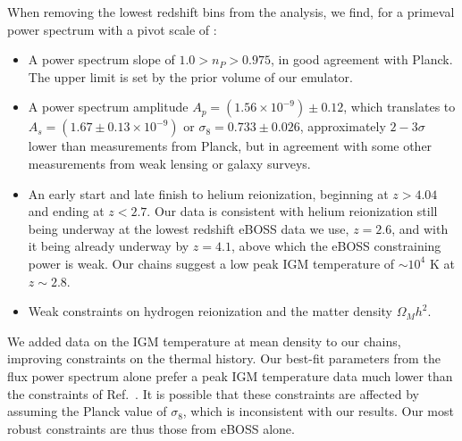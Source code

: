 When removing the lowest redshift bins from the analysis, we find, for a primeval power spectrum with a pivot scale of :
\begin{itemize}
    \item A power spectrum slope of $1.0 > n_P > 0.975$, in good agreement with Planck.
    The upper limit is set by the prior volume of our emulator.
    \item A power spectrum amplitude $A_p=\left(1.56\times10^{-9}\right) \pm 0.12$, which translates to $A_s=\left(1.67\pm0.13\times10^{-9}\right)$ or $\sigma_8 = 0.733 \pm 0.026$, approximately $2-3\sigma$ lower than measurements from Planck, but in agreement with some other measurements from weak lensing or galaxy surveys.
    \item An early start and late finish to helium reionization, beginning at $z > 4.04$ and ending at $z < 2.7$. Our data is consistent with helium reionization still being underway at the lowest redshift  eBOSS data we use, $z=2.6$, and with it being already underway by $z=4.1$, above which the eBOSS constraining power is weak. Our chains suggest a low peak IGM temperature of $\sim 10^4$ K at $z\sim 2.8$.
    \item Weak constraints on hydrogen reionization and the matter density $\Omega_M h^2$.
\end{itemize}

We added data on the IGM temperature at mean density to our chains, improving constraints on the thermal history. Our best-fit parameters from the flux power spectrum alone prefer a peak IGM temperature data much lower than the constraints of Ref.~\cite{2021MNRAS.506.4389G}. It is possible that these constraints are affected by assuming the Planck value of $\sigma_8$, which is inconsistent with our results. Our most robust constraints are thus those from eBOSS alone.

